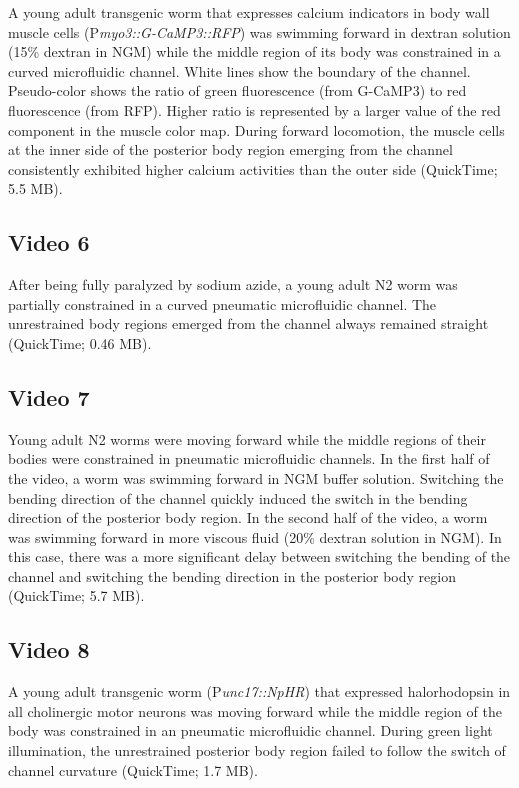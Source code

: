 A young adult transgenic worm that expresses calcium indicators in body wall muscle cells 
(P\textit{myo3::G-CaMP3::RFP}) was swimming forward in dextran solution (15\% dextran in NGM) 
while the middle region of its body was constrained in a curved microfluidic channel. White 
lines show the boundary of the channel. Pseudo-color shows the ratio of green fluorescence 
(from G-CaMP3) to red fluorescence (from RFP). Higher ratio is represented by a larger value of 
the red component in the muscle color map. During forward locomotion, the muscle cells at the 
inner side of the posterior body region emerging from the channel consistently exhibited higher 
calcium activities than the outer side (QuickTime; 5.5 MB). 
 
\subsection{Video 6}\label{video:prop6}
 
After being fully paralyzed by sodium azide, a young adult N2 worm was partially constrained in a 
curved pneumatic microfluidic channel. The unrestrained body regions emerged from the 
channel always remained straight (QuickTime; 0.46 MB).    
 
\subsection{Video 7}\label{video:prop7}
 
Young adult N2 worms were moving forward while the middle regions of their bodies were 
constrained in pneumatic microfluidic channels. In the first half of the video, a worm was 
swimming forward in NGM buffer solution. Switching the bending direction of the channel 
quickly induced the switch in the bending direction of the posterior body region. In the second 
half of the video, a worm was swimming forward in more viscous fluid (20\% dextran solution in 
NGM). In this case, there was a more significant delay between switching the bending of the 
channel and switching the bending direction in the posterior body region (QuickTime; 5.7 MB). 
 
\subsection{Video 8}\label{video:prop8} 
 
A young adult transgenic worm (P\textit{unc17::NpHR}) that expressed halorhodopsin in all cholinergic 
motor neurons was moving forward while the middle region of the body was constrained in an 
pneumatic microfluidic channel. During green light illumination, the unrestrained posterior body 
region failed to follow the switch of channel curvature (QuickTime; 1.7 MB). 
 
